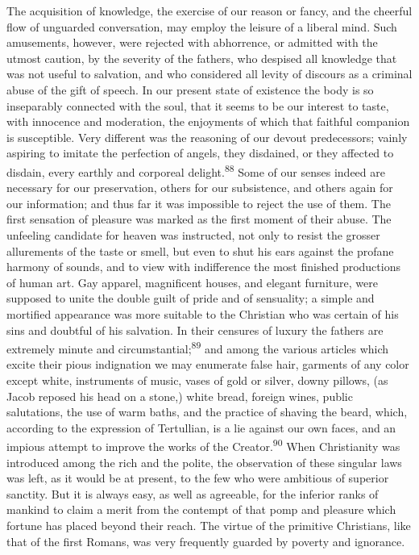 The acquisition of knowledge, the exercise of our reason or
fancy, and the cheerful flow of unguarded conversation, may
employ the leisure of a liberal mind. Such amusements, however,
were rejected with abhorrence, or admitted with the utmost
caution, by the severity of the fathers, who despised all
knowledge that was not useful to salvation, and who considered
all levity of discours as a criminal abuse of the gift of speech.
In our present state of existence the body is so inseparably
connected with the soul, that it seems to be our interest to
taste, with innocence and moderation, the enjoyments of which
that faithful companion is susceptible. Very different was the
reasoning of our devout predecessors; vainly aspiring to imitate
the perfection of angels, they disdained, or they affected to
disdain, every earthly and corporeal delight.\textsuperscript{88} Some of our
senses indeed are necessary for our preservation, others for our
subsistence, and others again for our information; and thus far
it was impossible to reject the use of them. The first sensation
of pleasure was marked as the first moment of their abuse. The
unfeeling candidate for heaven was instructed, not only to resist
the grosser allurements of the taste or smell, but even to shut
his ears against the profane harmony of sounds, and to view with
indifference the most finished productions of human art. Gay
apparel, magnificent houses, and elegant furniture, were supposed
to unite the double guilt of pride and of sensuality; a simple
and mortified appearance was more suitable to the Christian who
was certain of his sins and doubtful of his salvation. In their
censures of luxury the fathers are extremely minute and
circumstantial;\textsuperscript{89} and among the various articles which excite
their pious indignation we may enumerate false hair, garments of
any color except white, instruments of music, vases of gold or
silver, downy pillows, (as Jacob reposed his head on a stone,)
white bread, foreign wines, public salutations, the use of warm
baths, and the practice of shaving the beard, which, according to
the expression of Tertullian, is a lie against our own faces, and
an impious attempt to improve the works of the Creator.\textsuperscript{90} When
Christianity was introduced among the rich and the polite, the
observation of these singular laws was left, as it would be at
present, to the few who were ambitious of superior sanctity. But
it is always easy, as well as agreeable, for the inferior ranks
of mankind to claim a merit from the contempt of that pomp and
pleasure which fortune has placed beyond their reach. The virtue
of the primitive Christians, like that of the first Romans, was
very frequently guarded by poverty and ignorance.


